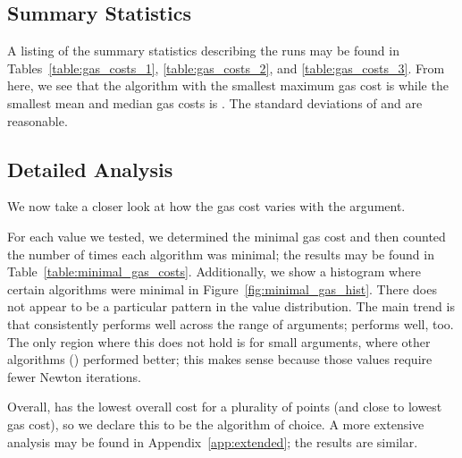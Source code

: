 \subsection{Summary Statistics}





A listing of the summary statistics describing the runs
may be found in Tables~\ref{table:gas_costs_1},
\ref{table:gas_costs_2}, and \ref{table:gas_costs_3}.
From here, we see that the algorithm with the smallest
maximum gas cost is \Linear{} while
the smallest mean and median gas costs is \UnrolledThree{}.
The standard deviations of \Linear{} and \UnrolledThree{} are reasonable.

\subsection{Detailed Analysis}

We now take a closer look at how the gas cost varies
with the argument.

For each value we tested,
we determined the minimal gas cost
and then counted the number of times each algorithm was minimal;
the results may be found in Table~\ref{table:minimal_gas_costs}.
Additionally, we show a histogram where certain algorithms
were minimal in Figure~\ref{fig:minimal_gas_hist}.
There does not appear to be a particular pattern
in the value distribution.
The main trend is that \UnrolledThree{}
consistently performs well across the range of arguments;
\Linear{} performs well, too.
The only region where this does not hold is for small arguments,
where other algorithms (\while{}) performed better;
this makes sense because those values require fewer Newton iterations.

Overall, \UnrolledThree{} has the lowest overall cost
for a plurality of points (and close to lowest gas cost),
so we declare this to be the algorithm of choice.
A more extensive analysis may be found in
Appendix~\ref{app:extended};
the results are similar.



